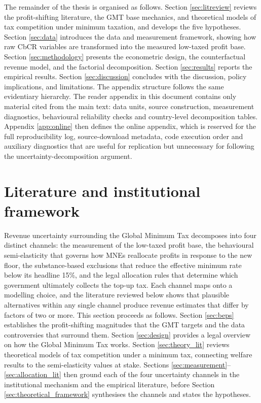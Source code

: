 \documentclass[11pt,a4paper]{article}
\begin{document}
The remainder of the thesis is organised as follows. Section \ref{sec:litreview} reviews the profit-shifting literature, the GMT base mechanics, and theoretical models of tax competition under minimum taxation, and develops the five hypotheses. Section \ref{sec:data} introduces the data and measurement framework, showing how raw CbCR variables are transformed into the measured low-taxed profit base. Section \ref{sec:methodology} presents the econometric design, the counterfactual revenue model, and the factorial decomposition. Section \ref{sec:results} reports the empirical results. Section \ref{sec:discussion} concludes with the discussion, policy implications, and limitations. The appendix structure follows the same evidentiary hierarchy. The reader appendix in this document contains only material cited from the main text: data units, source construction, measurement diagnostics, behavioural reliability checks and country-level decomposition tables. Appendix \ref{app:online} then defines the online appendix, which is reserved for the full reproducibility log, source-download metadata, code execution order and auxiliary diagnostics that are useful for replication but unnecessary for following the uncertainty-decomposition argument.

\newpage

\section{Literature and institutional framework}\label{sec:literature}\label{sec:litreview}

Revenue uncertainty surrounding the Global Minimum Tax decomposes into four distinct channels: the measurement of the low-taxed profit base, the behavioural semi-elasticity that governs how MNEs reallocate profits in response to the new floor, the substance-based exclusions that reduce the effective minimum rate below its headline 15\%, and the legal allocation rules that determine which government ultimately collects the top-up tax. Each channel maps onto a modelling choice, and the literature reviewed below shows that plausible alternatives within any single channel produce revenue estimates that differ by factors of two or more. This section proceeds as follows. Section \ref{sec:beps} establishes the profit-shifting magnitudes that the GMT targets and the data controversies that surround them. Section \ref{sec:design} provides a legal overview on how the Global Minimum Tax works. Section \ref{sec:theory_lit} reviews theoretical models of tax competition under a minimum tax, connecting welfare results to the semi-elasticity values at stake. Sections \ref{sec:measurement}--\ref{sec:allocation_lit} then ground each of the four uncertainty channels in the institutional mechanism and the empirical literature, before Section \ref{sec:theoretical_framework} synthesises the channels and states the hypotheses.
\end{document}
